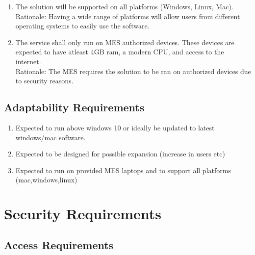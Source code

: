\documentclass[12pt]{article}
\begin{document}
\begin{enumerate}
  
  \item The solution will be supported on all platforms (Windows, Linux, Mac). \\
  Rationale: Having a wide range of platforms will allow users from different operating systems to easily use the software.
  \item The service shall only run on MES authorized devices. These devices are expected to have atleast 4GB ram, a modern CPU, and access to the internet. \\
  Rationale: The MES requires the solution to be ran on authorized devices due to security reasons.
\end{enumerate}
\subsection{Adaptability Requirements}
\begin{enumerate}
  
  \item Expected to run above windows 10 or ideally be updated to latest windows/mac software. \\
  \item Expected to be designed for possible expansion (increase in users etc) \\
  \item Expected to run on provided MES laptops and to support all platforms (mac,windows,linux)
\end{enumerate}





\section{Security Requirements}
\subsection{Access Requirements}
\end{document}
